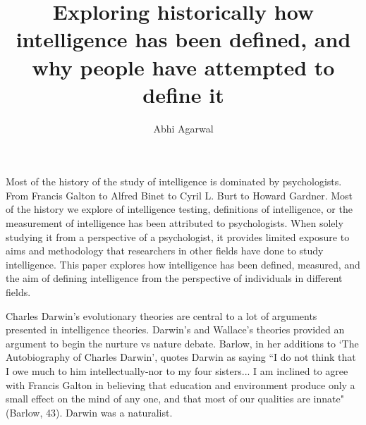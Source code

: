 \documentclass[11pt, oneside]{article}
\title{Exploring historically how intelligence has been defined, and why people have attempted to define it\vspace{-0.4cm}}
\author{Abhi Agarwal\vspace{-1cm}}
\date{}
\begin{document}
\maketitle


\par Most of the history of the study of intelligence is dominated by psychologists. From Francis Galton to Alfred Binet to Cyril L. Burt to Howard Gardner. Most of the history we explore of intelligence testing, definitions of intelligence, or the measurement of intelligence has been attributed to psychologists. When solely studying it from a perspective of a psychologist, it provides limited exposure to aims and methodology that researchers in other fields have done to study intelligence. This paper explores how intelligence has been defined, measured, and the aim of defining intelligence from the perspective of individuals in different fields.




\par Charles Darwin's evolutionary theories are central to a lot of arguments presented in intelligence theories. Darwin's and Wallace's theories provided an argument to begin the nurture vs nature debate. Barlow, in her additions to `The Autobiography of Charles Darwin',  quotes Darwin as saying ``I do not think that I owe much to him intellectually-nor to my four sisters... I am inclined to agree with Francis Galton in believing that education and environment produce only a small effect on the mind of any one, and that most of our qualities are innate" (Barlow, 43).
Darwin was a naturalist.

\end{document}
